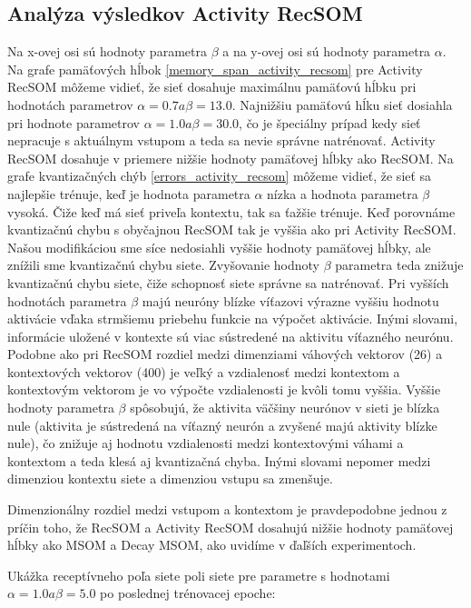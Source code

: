 \subsection{Analýza výsledkov Activity RecSOM}
Na x-ovej osi sú hodnoty parametra $\beta$ a na y-ovej osi sú hodnoty parametra $\alpha$.
Na grafe pamäťových hĺbok \ref{memory_span_activity_recsom} pre Activity RecSOM môžeme vidieť, že sieť dosahuje 
maximálnu pamäťovú hĺbku pri hodnotách parametrov $\alpha = 0.7 a \beta = 13.0$.
Najnižšiu pamäťovú hĺku sieť dosiahla pri hodnote parametrov  $\alpha = 1.0 a \beta = 30.0$, čo je špeciálny prípad
kedy sieť nepracuje s aktuálnym vstupom a teda sa nevie správne natrénovať.
Activity RecSOM dosahuje v priemere nižšie hodnoty pamäťovej hĺbky ako RecSOM.
Na grafe kvantizačných chýb \ref{errors_activity_recsom} môžeme vidieť, že sieť sa najlepšie trénuje, keď je hodnota 
parametra $\alpha$ nízka a hodnota parametra $\beta$ vysoká. Čiže keď má sieť priveľa kontextu, tak sa ťažšie trénuje.
Keď porovnáme kvantizačnú chybu s obyčajnou RecSOM tak je vyššia ako pri Activity RecSOM. 
Našou modifikáciou sme síce nedosiahli vyššie hodnoty pamäťovej hĺbky, ale znížili sme kvantizačnú chybu siete.
Zvyšovanie hodnoty $\beta$ parametra teda znižuje kvantizačnú chybu siete, čiže schopnosť siete správne sa natrénovať.
Pri vyšších hodnotách parametra $\beta$ majú neuróny blízke víťazovi výrazne vyššiu hodnotu aktivácie vďaka strmšiemu priebehu funkcie na výpočet aktivácie. 
Inými slovami, informácie uložené v kontexte sú viac sústredené na aktivitu víťazného neurónu. 
Podobne ako pri RecSOM rozdiel medzi dimenziami váhových vektorov (26) a kontextových vektorov (400) je veľký a vzdialenosť medzi kontextom a kontextovým vektorom
je vo výpočte vzdialenosti je kvôli tomu vyššia. Vyššie hodnoty parametra $\beta$ spôsobujú, že aktivita väčšiny neurónov v sieti je blízka nule (aktivita je sústredená na víťazný neurón a zvyšené majú aktivity blízke nule), čo znižuje aj hodnotu
vzdialenosti medzi kontextovými váhami a kontextom a teda klesá aj kvantizačná chyba. Inými slovami nepomer medzi dimenziou kontextu siete a dimenziou vstupu sa zmenšuje.

Dimenzionálny rozdiel medzi vstupom a kontextom je pravdepodobne jednou z príčin toho, že RecSOM a Activity RecSOM dosahujú nižšie hodnoty 
pamäťovej hĺbky ako MSOM a Decay MSOM, ako uvidíme v ďaľších experimentoch.

Ukážka receptívneho poľa siete poli siete pre parametre s hodnotami $\alpha = 1.0 a \beta = 5.0$ po poslednej trénovacej epoche:


